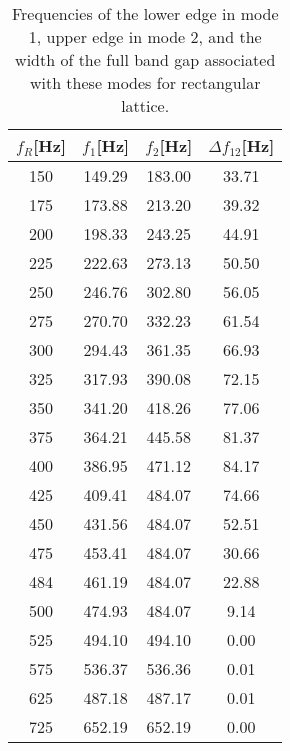 \documentclass{article}
\begin{document}
\begin{table}[htb]
\centering
\caption{Frequencies of the lower edge in mode 1, upper edge in mode 2, and the width of the full band gap associated with these modes for rectangular lattice.}
\label{tab200}
\begin{tabular}{cccc}
\hline
$f_R$[Hz] & $f_1$[Hz] & $f_2$[Hz] & $\Delta f _{12}$[Hz] \\ \hline
150 & 149.29 & 183.00 & 33.71 \\ \hline
175 & 173.88 & 213.20 & 39.32 \\ \hline
200 & 198.33 & 243.25 & 44.91 \\ \hline
225 & 222.63 & 273.13 & 50.50 \\ \hline
250 & 246.76 & 302.80 & 56.05 \\ \hline
275 & 270.70 & 332.23 & 61.54 \\ \hline
300 & 294.43 & 361.35 & 66.93 \\ \hline
325 & 317.93 & 390.08 & 72.15 \\ \hline
350 & 341.20 & 418.26 & 77.06 \\ \hline
375 & 364.21 & 445.58 & 81.37 \\ \hline
400 & 386.95 & 471.12 & 84.17 \\ \hline
425 & 409.41 & 484.07 & 74.66 \\ \hline
450 & 431.56 & 484.07 & 52.51 \\ \hline
475 & 453.41 & 484.07 & 30.66 \\ \hline
484 & 461.19 & 484.07 & 22.88 \\ \hline
500 & 474.93 & 484.07 & 9.14 \\ \hline
525 & 494.10 & 494.10 & 0.00 \\ \hline
575 & 536.37 & 536.36 & 0.01 \\ \hline
625 & 487.18 & 487.17 & 0.01 \\ \hline
725 & 652.19 & 652.19 & 0.00 \\ \hline
\end{tabular}
\end{table}
\end{document}

